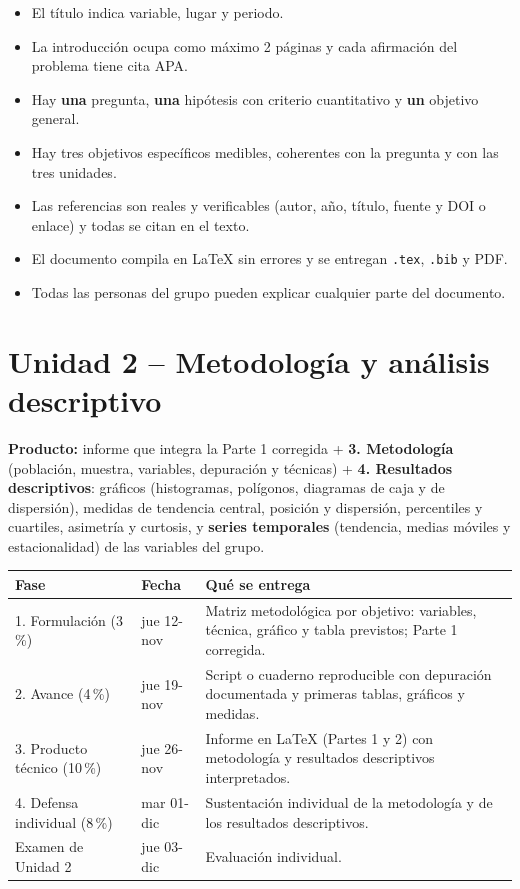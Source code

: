 \documentclass[11pt,a4paper]{article}
\begin{document}
\begin{itemize}[label=$\square$]
  \item El título indica variable, lugar y periodo.
  \item La introducción ocupa como máximo 2 páginas y cada afirmación del problema tiene cita APA.
  \item Hay \textbf{una} pregunta, \textbf{una} hipótesis con criterio cuantitativo y \textbf{un} objetivo general.
  \item Hay tres objetivos específicos medibles, coherentes con la pregunta y con las tres unidades.
  \item Las referencias son reales y verificables (autor, año, título, fuente y DOI o enlace) y todas se citan en el texto.
  \item El documento compila en \LaTeX{} sin errores y se entregan \texttt{.tex}, \texttt{.bib} y PDF.
  \item Todas las personas del grupo pueden explicar cualquier parte del documento.
\end{itemize}

\section{Unidad 2 -- Metodología y análisis descriptivo}

\textbf{Producto:} informe que integra la Parte 1 corregida + \textbf{3. Metodología} (población, muestra, variables, depuración y técnicas) + \textbf{4. Resultados descriptivos}: gráficos (histogramas, polígonos, diagramas de caja y de dispersión), medidas de tendencia central, posición y dispersión, percentiles y cuartiles, asimetría y curtosis, y \textbf{series temporales} (tendencia, medias móviles y estacionalidad) de las variables del grupo.

\begin{center}
\small
\renewcommand{\arraystretch}{1.2}
\begin{tabularx}{\textwidth}{L{2.9cm}C{1.7cm}Y}
\toprule
\textbf{Fase} & \textbf{Fecha} & \textbf{Qué se entrega} \\
. Formulación (3\,\%) & jue 12-nov & Matriz metodológica por objetivo: variables, técnica, gráfico y tabla previstos; Parte 1 corregida. \\
2. Avance (4\,\%) & jue 19-nov & Script o cuaderno reproducible con depuración documentada y primeras tablas, gráficos y medidas. \\
3. Producto técnico (10\,\%) & jue 26-nov & Informe en \LaTeX{} (Partes 1 y 2) con metodología y resultados descriptivos interpretados. \\
4. Defensa individual (8\,\%) & mar 01-dic & Sustentación individual de la metodología y de los resultados descriptivos. \\
Examen de Unidad 2 & jue 03-dic & Evaluación individual. \\
\bottomrule
\end{tabularx}
\end{center}
\end{document}
